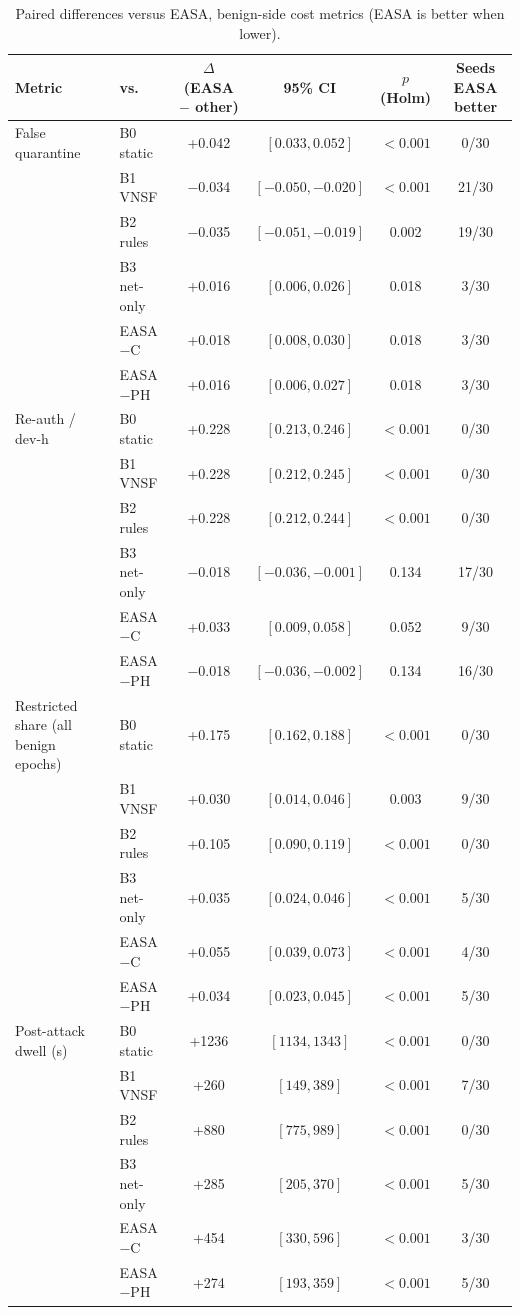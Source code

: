 \begin{table}[!b]
\caption{Paired differences versus EASA, benign-side cost metrics (EASA is better when lower).}
\label{tab:paired-cost}
\centering\scriptsize
\setlength{\tabcolsep}{4pt}
\begin{tabular}{llcccc}
\toprule
Metric & vs. & $\Delta$ (EASA $-$ other) & 95\% CI & $p$ (Holm) & Seeds EASA better \\
\midrule
False quarantine & B0 static & +0.042 & $[0.033, 0.052]$ & $<0.001$ & 0/30 \\
 & B1 VNSF & $-$0.034 & $[-0.050, -0.020]$ & $<0.001$ & 21/30 \\
 & B2 rules & $-$0.035 & $[-0.051, -0.019]$ & 0.002 & 19/30 \\
 & B3 net-only & +0.016 & $[0.006, 0.026]$ & 0.018 & 3/30 \\
 & EASA$-$C & +0.018 & $[0.008, 0.030]$ & 0.018 & 3/30 \\
 & EASA$-$PH & +0.016 & $[0.006, 0.027]$ & 0.018 & 3/30 \\
\midrule
Re-auth / dev-h & B0 static & +0.228 & $[0.213, 0.246]$ & $<0.001$ & 0/30 \\
 & B1 VNSF & +0.228 & $[0.212, 0.245]$ & $<0.001$ & 0/30 \\
 & B2 rules & +0.228 & $[0.212, 0.244]$ & $<0.001$ & 0/30 \\
 & B3 net-only & $-$0.018 & $[-0.036, -0.001]$ & 0.134 & 17/30 \\
 & EASA$-$C & +0.033 & $[0.009, 0.058]$ & 0.052 & 9/30 \\
 & EASA$-$PH & $-$0.018 & $[-0.036, -0.002]$ & 0.134 & 16/30 \\
\midrule
Restricted share (all benign epochs) & B0 static & +0.175 & $[0.162, 0.188]$ & $<0.001$ & 0/30 \\
 & B1 VNSF & +0.030 & $[0.014, 0.046]$ & 0.003 & 9/30 \\
 & B2 rules & +0.105 & $[0.090, 0.119]$ & $<0.001$ & 0/30 \\
 & B3 net-only & +0.035 & $[0.024, 0.046]$ & $<0.001$ & 5/30 \\
 & EASA$-$C & +0.055 & $[0.039, 0.073]$ & $<0.001$ & 4/30 \\
 & EASA$-$PH & +0.034 & $[0.023, 0.045]$ & $<0.001$ & 5/30 \\
\midrule
Post-attack dwell (s) & B0 static & +1236 & $[1134, 1343]$ & $<0.001$ & 0/30 \\
 & B1 VNSF & +260 & $[149, 389]$ & $<0.001$ & 7/30 \\
 & B2 rules & +880 & $[775, 989]$ & $<0.001$ & 0/30 \\
 & B3 net-only & +285 & $[205, 370]$ & $<0.001$ & 5/30 \\
 & EASA$-$C & +454 & $[330, 596]$ & $<0.001$ & 3/30 \\
 & EASA$-$PH & +274 & $[193, 359]$ & $<0.001$ & 5/30 \\
\bottomrule
\end{tabular}
\end{table}
